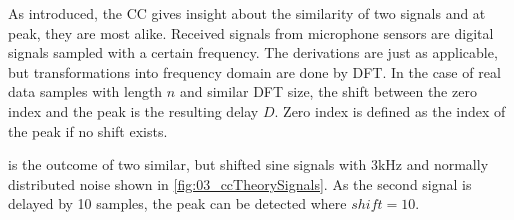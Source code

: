 As introduced, the \ac{CC} gives insight about the similarity of two signals and at peak, they
are most alike.
Received signals from microphone sensors are digital signals sampled with a certain
frequency.
The derivations are just as applicable, but transformations into frequency
domain are done by \ac{DFT}.
In the case of real data samples with length $n$ and similar \ac{DFT} size, the shift between
the zero index and the peak is the resulting delay $D$.
Zero index is defined as the index of the peak if no shift exists.

 is the outcome of two similar, but shifted sine signals with
3\si{\kilo\hertz} and normally distributed noise shown in \cref{fig:03_ccTheorySignals}.
As the second signal is delayed by 10 samples, the peak can be detected where $shift = 10$.
